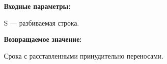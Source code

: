 \textbf{Входные параметры:}

S --- разбиваемая строка.

\textbf{Возвращаемое значение:}

 Срока с расставленными принудительно переносами.